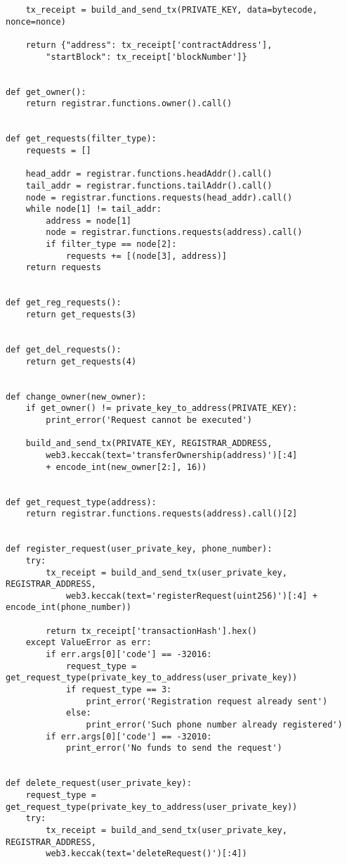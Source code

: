 \begin{verbatim}
    tx_receipt = build_and_send_tx(PRIVATE_KEY, data=bytecode, nonce=nonce)

    return {"address": tx_receipt['contractAddress'], 
        "startBlock": tx_receipt['blockNumber']}


def get_owner():
    return registrar.functions.owner().call()


def get_requests(filter_type):
    requests = []

    head_addr = registrar.functions.headAddr().call()
    tail_addr = registrar.functions.tailAddr().call()
    node = registrar.functions.requests(head_addr).call()
    while node[1] != tail_addr:
        address = node[1]
        node = registrar.functions.requests(address).call()
        if filter_type == node[2]:
            requests += [(node[3], address)]
    return requests


def get_reg_requests():
    return get_requests(3)


def get_del_requests():
    return get_requests(4)


def change_owner(new_owner):
    if get_owner() != private_key_to_address(PRIVATE_KEY):
        print_error('Request cannot be executed')

    build_and_send_tx(PRIVATE_KEY, REGISTRAR_ADDRESS,
        web3.keccak(text='transferOwnership(address)')[:4] 
        + encode_int(new_owner[2:], 16))


def get_request_type(address):
    return registrar.functions.requests(address).call()[2]


def register_request(user_private_key, phone_number):
    try:
        tx_receipt = build_and_send_tx(user_private_key, REGISTRAR_ADDRESS,
            web3.keccak(text='registerRequest(uint256)')[:4] + encode_int(phone_number))

        return tx_receipt['transactionHash'].hex()
    except ValueError as err:
        if err.args[0]['code'] == -32016:
            request_type = get_request_type(private_key_to_address(user_private_key))
            if request_type == 3:
                print_error('Registration request already sent')
            else:
                print_error('Such phone number already registered')
        if err.args[0]['code'] == -32010:
            print_error('No funds to send the request')


def delete_request(user_private_key):
    request_type = get_request_type(private_key_to_address(user_private_key))
    try:
        tx_receipt = build_and_send_tx(user_private_key, REGISTRAR_ADDRESS,     
        web3.keccak(text='deleteRequest()')[:4])


\end{verbatim}
